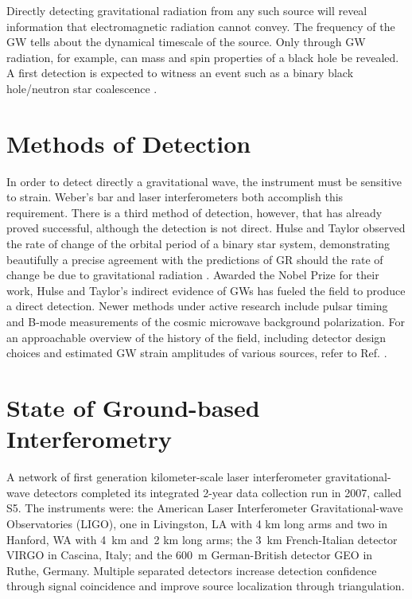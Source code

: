 Directly detecting gravitational radiation from any such source will
reveal information that electromagnetic radiation cannot convey. The
frequency of the GW tells about the dynamical timescale of the
source. Only through GW radiation, for example, can mass and spin
properties of a black hole be revealed. A first detection is expected
to witness an event such as a binary black hole/neutron star
coalescence \cite{Abadie2010Predictions}.





\section{Methods of Detection}
In order to detect directly a gravitational wave, the instrument must
be sensitive to strain. Weber's bar and laser interferometers both
accomplish this requirement. There is a third method of detection,
however, that has already proved successful, although the detection is
not direct. Hulse and Taylor observed the rate of change of the
orbital period of a binary star system, demonstrating beautifully a
precise agreement with the predictions of GR should the rate of change
be due to gravitational radiation \cite{Hulse1975Discovery,
  Weisberg2005Relativistic}. Awarded the Nobel Prize for their work,
Hulse and Taylor's indirect evidence of GWs has fueled the field to
produce a direct detection. Newer methods under active research
include pulsar timing \cite{Hobbs2009International} and B-mode
measurements of the cosmic microwave background polarization. For an
approachable overview of the history of the field, including detector
design choices and estimated GW strain amplitudes of various sources,
refer to Ref. \cite{Linsay1983Study}.






\section{State of Ground-based Interferometry}
A network of first generation kilometer-scale laser interferometer
gravitational-wave detectors completed its integrated 2-year data
collection run in 2007, called S5. The instruments were: the American
Laser Interferometer Gravitational-wave Observatories (LIGO)\cite{Abbott2009LIGO},
one in Livingston, LA with 4 km long arms and two in Hanford, WA with
4~km and~2 km long arms; the 3~km French-Italian detector
VIRGO\cite{Acernese2008Virgo} in Cascina, Italy; and the 600~m
German-British detector GEO\cite{Luck2006Status} in Ruthe, Germany. Multiple
separated detectors increase detection confidence through signal
coincidence and improve source localization through triangulation.

